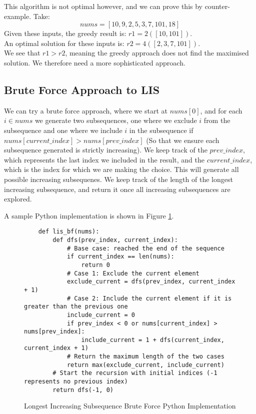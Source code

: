 This algorithm is not optimal however, and we can prove this by counter-example.
Take:$$nums = [10,9,2,5,3,7,101,18]$$
Given these inputs, the greedy result is: $r1 = 2  ([10,101])$.\\
An optimal solution for these inputs is: $r2 = 4 ([2,3,7,101])$.\\
We see that $r1 > r2$, meaning the greedy approach does not find the maximised solution.
We therefore need a more sophisticated approach.

\subsection{Brute Force Approach to LIS}

We can try a brute force approach, where we start at $nums[0]$, and for each $i \in nums$ we generate two subsequences,
one where we  exclude $i$ from the subsequence and one where we include $i$ in the subsequence if
$nums[current\_index] > nums[prev\_index]$ (So that we ensure each subsequence generated is strictly increasing).
We keep track of the $prev\_index$, which represents the last index we included in the result,
and the $current\_index$, which is the index for which we are making the choice.
This will generate all possible increasing subsequenes.
We keep track of the length of the longest increasing subsequence, and return it once all increasing subsequences are explored.

A sample Python implementation is shown in Figure \ref{fig:lis-bf}.

\begin{figure}[H]
    \centering
    \begin{lstlisting}
    def lis_bf(nums):
        def dfs(prev_index, current_index):
            # Base case: reached the end of the sequence
            if current_index == len(nums):
                return 0
            # Case 1: Exclude the current element
            exclude_current = dfs(prev_index, current_index + 1)
            # Case 2: Include the current element if it is greater than the previous one
            include_current = 0
            if prev_index < 0 or nums[current_index] > nums[prev_index]:
                include_current = 1 + dfs(current_index, current_index + 1)
            # Return the maximum length of the two cases
            return max(exclude_current, include_current)
        # Start the recursion with initial indices (-1 represents no previous index)
        return dfs(-1, 0)
    \end{lstlisting}
    \caption{Longest Increasing Subsequence Brute Force Python Implementation}
    \label{fig:lis-bf}
\end{figure}

